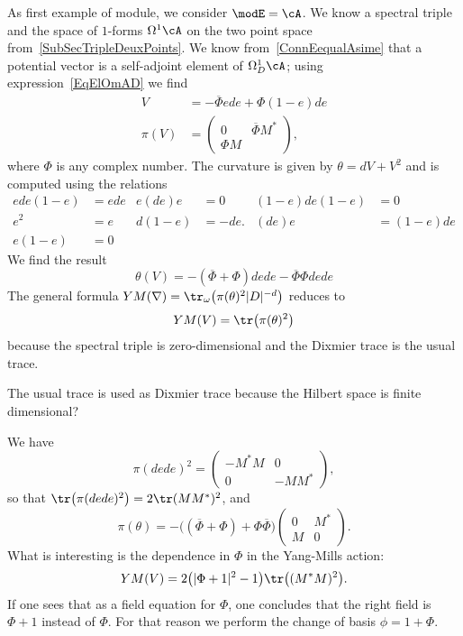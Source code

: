 As first example of module, we consider $\modE=\cA$. We know a spectral triple and the space of $1$-forms $\Omega^1\cA$ on the two point space from~\ref{SubSecTripleDeuxPoints}. We know from~\ref{ConnEequalAsime} that a potential vector is a self-adjoint element of $\Omega^1_D\cA$; using expression~\ref{EqElOmAD} we find
\begin{align}
	V      & =-\overline{ \Phi }ede+\Phi(1-e)de \\
	\pi(V) & =\begin{pmatrix}
		          0 & \overline{ \Phi }M^* \\
		          \Phi M
	          \end{pmatrix},
\end{align}
where $\Phi$ is any complex number. The curvature is given by $\theta=dV+V^2$ and is computed using the relations
\begin{align*}
	ede(1-e) & =ede & e(de)e & =0    & (1-e)de(1-e) & =0       \\
	e^2      & =e   & d(1-e) & =-de. & (de)e        & =(1-e)de \\
	e(1-e)   & =0
\end{align*}
We find the result
\begin{equation}
	\theta(V)=-(\overline{ \Phi }+\Phi)dede-\overline{ \Phi }\Phi dede
\end{equation}
The general formula $YM(\nabla)=\tr_{\omega}\big( \pi(\theta)^2| D |^{-d} \big)$ reduces to
\[
	YM(V)=\tr\big( \pi(\theta)^{2} \big)
\]
because the spectral triple is zero-dimensional and the Dixmier trace is the usual trace.

\begin{probleme}
	The usual trace is used as Dixmier trace because the Hilbert space is finite dimensional?
\end{probleme}
We have
\[
	\pi(dede)^2=\begin{pmatrix}
		-M^*M & 0 \\0&-MM^*
	\end{pmatrix},
\]
so that $\tr\big( \pi(dede)^2 \big)=2\tr(MM^*)^2$, and
\[
	\pi(\theta)=-\big( (\overline{ \Phi }+\Phi)+\Phi\overline{ \Phi } \big)\begin{pmatrix}
		0 & M^* \\M&0
	\end{pmatrix}.
\]
What is interesting is the dependence in $\Phi$ in the Yang-Mills action:
\begin{equation}
	YM(V)=2\big( | \Phi+1 |^2-1 \big)\tr\big( (M^*M)^2 \big).
\end{equation}
If one sees that as a field equation for $\Phi$, one concludes that the right field is $\Phi+1$ instead of $\Phi$. For that reason we perform the change of basis $\phi=1+\Phi$.

